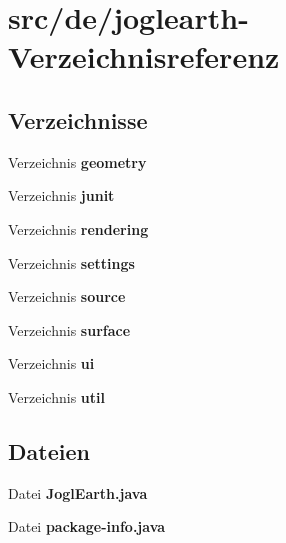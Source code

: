 \section{src/de/joglearth-\/\-Verzeichnisreferenz}
\label{dir_fb845e964c02d43339a7d02b68a3ba21}
\subsection*{Verzeichnisse}
\begin{DoxyCompactItemize}
\item 
Verzeichnis {\bf geometry}
\item 
Verzeichnis {\bf junit}
\item 
Verzeichnis {\bf rendering}
\item 
Verzeichnis {\bf settings}
\item 
Verzeichnis {\bf source}
\item 
Verzeichnis {\bf surface}
\item 
Verzeichnis {\bf ui}
\item 
Verzeichnis {\bf util}
\end{DoxyCompactItemize}
\subsection*{Dateien}
\begin{DoxyCompactItemize}
\item 
Datei {\bfseries Jogl\-Earth.\-java}
\item 
Datei {\bfseries package-\/info.\-java}
\end{DoxyCompactItemize}
